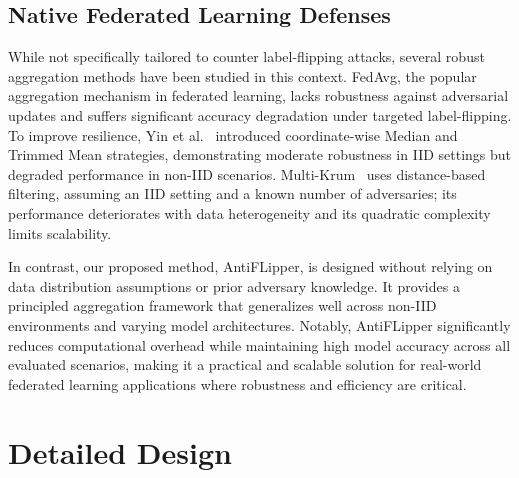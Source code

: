 \documentclass[conference]{IEEEtran}
\begin{document}

\subsection{Native Federated Learning Defenses}

While not specifically tailored to counter label-flipping attacks, several robust aggregation methods have been studied in this context. FedAvg\cite{fedavg-pmlr-v54-mcmahan17a}, the popular aggregation mechanism in federated learning, lacks robustness against adversarial updates and suffers significant accuracy degradation under targeted label-flipping. To improve resilience, Yin et al.~\cite{yin2018byzantine} introduced coordinate-wise Median and Trimmed Mean strategies, demonstrating moderate robustness in IID settings but degraded performance in non-IID scenarios. Multi-Krum~\cite{NIPS2017_f4b9ec30} uses distance-based filtering, assuming an IID setting and a known number of adversaries; its performance deteriorates with data heterogeneity and its quadratic complexity limits scalability.

In contrast, our proposed method, AntiFLipper, is designed without relying on data distribution assumptions or prior adversary knowledge. It provides a principled aggregation framework that generalizes well across non-IID environments and varying model architectures. Notably, AntiFLipper significantly reduces computational overhead while maintaining high model accuracy across all evaluated scenarios, making it a practical and scalable solution for real-world federated learning applications where robustness and efficiency are critical.


\section{Detailed Design}
\label{sec:methodology}
\end{document}

